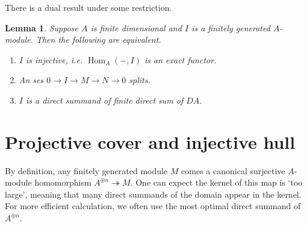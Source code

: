 \documentclass[11pt,a4paper]{article}
\makeatletter
\numberwithin{equation}{section}
\renewenvironment{proof}[1][\proofname]{\par
    \pushQED{\qed}%
    \normalfont \topsep0\p@\@plus6\p@ \labelsep1em\relax
    \trivlist
    \item[\hskip\labelsep\indent
        \bfseries #1]\ignorespaces
    \mbox{}
}{
    \popQED\endtrivlist\@endpefalse
}
\theoremstyle{all}
\newtheorem{lemma}[theorem]{Lemma}
\newtheorem{definition}[theorem]{Definition}
\theoremstyle{remark}
\newcommand{\Hom}{\operatorname{Hom}\nolimits}
\makeatother
\begin{document}
There is a dual result under some restriction.
\begin{lemma}
Suppose $A$ is finite dimensional and $I$ is a finitely generated $A$-module.
Then the following are equivalent.
\begin{enumerate}
\item $I$ is injective, i.e. $\Hom_A(-,I)$ is an exact functor.
\item An ses $0\to I\to M\to N\to 0$ splits.
\item $I$ is a direct summand of finite direct sum of $DA$.
\end{enumerate}
\end{lemma}

%


\pagebreak

\section{Projective cover and injective hull}

By definition, any finitely generated module $M$ comes a canonical surjective $A$-module homomorphism $A^{\oplus n}\twoheadrightarrow M$.
One can expect the kernel of this map is `too large', meaning that many direct summands of the domain appear in the kernel.  
For more efficient calculation, we often use the most optimal direct summand of $A^{\oplus n}$.
\end{document}
